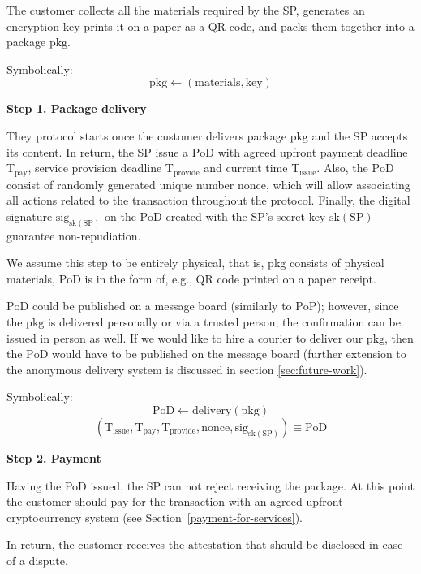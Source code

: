 \documentclass{ieeeaccess}
\begin{document}
The customer collects all the $\mathrm{materials}$ required by the SP, generates an encryption $\mathrm{key}$ prints it on a paper as a QR code, and packs them together into a package $\mathrm{pkg}$.

Symbolically: 
\[
\mathrm{pkg} \gets (\mathrm{materials}, \mathrm{key})
\]

\noindent \textbf
{Step 1. Package delivery}\label{step-1-package-delivery}

They protocol starts once the customer delivers package $\mathrm{pkg}$ and the SP accepts its content. In return, the SP issue a $\mathrm{PoD}$ with agreed upfront payment deadline $\mathrm{T}_\mathrm{pay}$, service provision deadline $\mathrm{T}_\mathrm{provide}$ and current time $\mathrm{T}_\mathrm{issue}$. Also, the $\mathrm{PoD}$ consist of randomly generated unique number $\mathrm{nonce}$, which will allow associating all actions related to the transaction throughout the protocol. Finally, the digital signature $\mathrm{sig}_{\mathrm{sk}(\mathrm{SP})}$ on the $\mathrm{PoD}$ created with the SP's secret key $\mathrm{sk}(\mathrm{SP})$ guarantee non-repudiation.

We assume this step to be entirely physical, that is, $\mathrm{pkg}$ consists of physical materials, $\mathrm{PoD}$ is in the form of, e.g., QR code printed on a paper receipt. 

$\mathrm{PoD}$ could be published on a message board (similarly to $\mathrm{PoP}$); however, since the $\mathrm{pkg}$ is delivered personally or via a trusted person, the confirmation can be issued in person as well. If we would like to hire a courier to deliver our $\mathrm{pkg}$, then the $\mathrm{PoD}$ would have to be published on the message board (further extension to the anonymous delivery system is discussed in section \ref{sec:future-work}).

Symbolically: 
\[
\mathrm{PoD} \gets \mathrm{delivery}(\mathrm{pkg})
\]
\[
(\mathrm{T}_\mathrm{issue}, \mathrm{T}_\mathrm{pay}, \mathrm{T}_\mathrm{provide}, \mathrm{nonce}, \mathrm{sig}_{\mathrm{sk}(\mathrm{SP})}) \equiv \mathrm{PoD}
\]

\noindent \textbf
{Step 2. Payment}\label{step-2-payment}

Having the PoD issued, the SP can not reject receiving the package. At this point the
customer should pay for the transaction with an agreed upfront cryptocurrency system (see Section~\ref{payment-for-services}).

In return, the customer receives the $\mathrm{attestation}$ that should be disclosed in case of a dispute.
\end{document}
